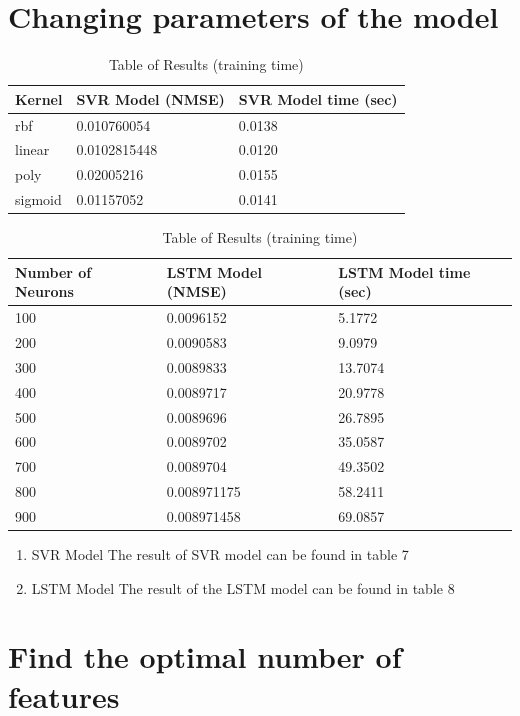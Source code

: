 \documentclass{article}
\begin{document}
\section{Changing parameters of the model}

\begin{table}[ht]
	\centering
	\begin{tabular}{p{2cm} p{2cm} p{2cm}}
		\toprule
		Kernel & SVR Model (NMSE) & SVR Model time (sec)  \\
		\midrule
		rbf & 0.010760054 & 0.0138 \\
		\midrule
		linear & 0.0102815448 & 0.0120 \\
		\midrule
		poly & 0.02005216 & 0.0155 \\
		\midrule
		sigmoid & 0.01157052 & 0.0141 \\
		\bottomrule
	\end{tabular}
	\caption{Table of Results (training time)}
\end{table}

\begin{table}[ht]
	\centering
	\begin{tabular}{p{2cm} p{2cm} p{2cm}}
		\toprule
		Number of Neurons & LSTM Model (NMSE) & LSTM Model time (sec)  \\
		\midrule
		100 & 0.0096152 & 5.1772 \\
		\midrule
		200 & 0.0090583 & 9.0979 \\
		\midrule
		300 & 0.0089833 & 13.7074 \\
		\midrule
		400 & 0.0089717 & 20.9778 \\
		\midrule
		500 & 0.0089696 & 26.7895 \\
		\midrule
		600 & 0.0089702 & 35.0587 \\
		\midrule
		700 & 0.0089704 & 49.3502 \\
		\midrule
		800 & 0.008971175 & 58.2411 \\
		\midrule
		900 & 0.008971458 & 69.0857 \\
		\bottomrule
	\end{tabular}
	\caption{Table of Results (training time)}
\end{table}
\begin{enumerate}
	\item SVR Model
		The result of SVR model can be found in table 7
	\item LSTM Model
		The result of the LSTM model can be found in table 8
\end{enumerate}

\section{Find the optimal number of features}
\end{document}
